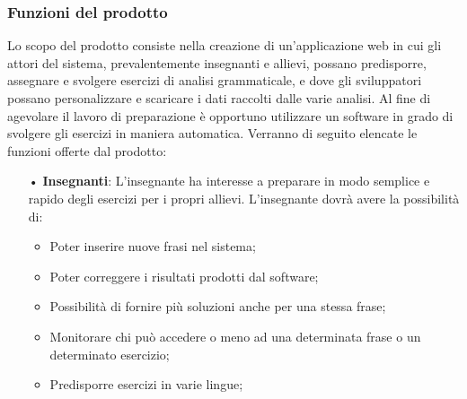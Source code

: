 \subsubsection{Funzioni del prodotto}
Lo scopo del prodotto consiste nella creazione di un'applicazione web in cui gli attori del sistema, prevalentemente insegnanti e allievi, possano predisporre, assegnare e svolgere esercizi di analisi grammaticale, e dove gli sviluppatori possano personalizzare e scaricare i dati raccolti dalle varie analisi.
Al fine di agevolare il lavoro di preparazione è opportuno utilizzare un software in grado di svolgere gli esercizi in maniera automatica.
Verranno di seguito elencate le funzioni offerte dal prodotto:
\begin{itemize}
\item[•]\textbf{Insegnanti}:
L'insegnante ha interesse a preparare in modo semplice e rapido degli esercizi per i propri allievi.
L'insegnante dovrà avere la possibilità di:
\begin{itemize}
\item Poter inserire nuove frasi nel sistema;
\item Poter correggere i risultati prodotti dal software;
\item Possibilità di fornire più soluzioni anche per una stessa frase;
\item Monitorare chi può accedere o meno ad una determinata frase o un determinato esercizio;
\item Predisporre esercizi in varie lingue;
\end{itemize}


\end{itemize}
